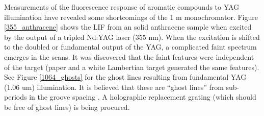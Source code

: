 

Measurements of the fluorescence response of aromatic compounds to YAG illumination have revealed some shortcomings of the 1 m monochromator. Figure \ref{355_anthracene} shows the LIF from an solid anthracene sample when excited by the output of a tripled Nd:YAG laser (355 nm). When the excitation is shifted to the doubled or fundamental output of the YAG, a complicated faint spectrum emerges in the scans. It was discovered that the faint features were independent of the target (paper and a white Lambertian target generated the same features). See Figure \ref{1064_ghosts} for the ghost lines resulting from fundamental YAG (1.06 um) illumination. It is believed that these are ``ghost lines'' from sub-periods in the groove spacing \cite{Palmer:2002a}. A holographic replacement grating (which should be free of ghost lines) is being procured.
